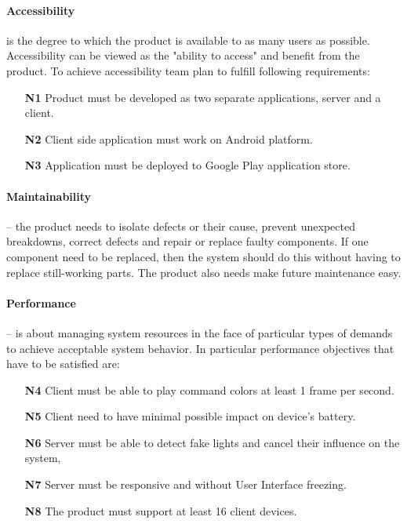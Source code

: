 \paragraph{Accessibility}
is the degree to which the product is available to as many users as possible. 
Accessibility can be viewed as the "ability to access" and benefit from the product. 
To achieve accessibility team plan to fulfill following requirements:
\begin{enumerate}
\item[\textbf{N1}] \label{req_N1} Product must be developed as two separate applications, server and a client.
\item[\textbf{N2}] \label{req_N2} Client side application must work on Android platform.
\item[\textbf{N3}] \label{req_N3} Application must be deployed to Google Play application store.
\end{enumerate}

\paragraph{Maintainability}
-- the product needs to isolate defects or their cause, prevent unexpected breakdowns, correct defects and repair or replace faulty components. If one component need to be replaced, then the system should do this without having to replace still-working parts. The product also needs make future maintenance easy. 

\paragraph{Performance}
-- is about managing system resources in the face of particular types of demands to achieve acceptable system behavior. In particular performance objectives that have to be satisfied are:
\begin{itemize}
\item [\textbf{N4}] \label{req_N4}  Client must be able to play command colors at least 1 frame per second.
\item [\textbf{N5}] \label{req_N5} Client need to have minimal possible impact on device's battery.
\item [\textbf{N6}] \label{req_N6} Server must be able to detect fake lights and cancel their influence on the system,
\item [\textbf{N7}] \label{req_N7} Server must be responsive and without User Interface freezing.
\item[\textbf{N8}] \label{req_N8} The product must support at least 16 client devices.
\end{itemize}


